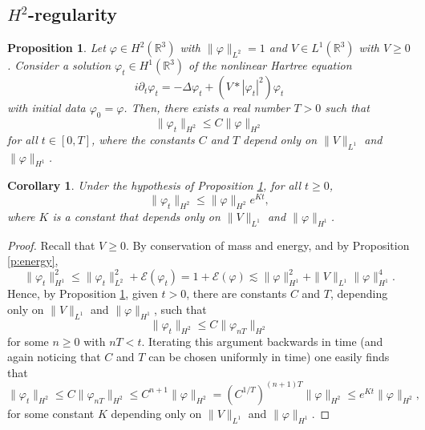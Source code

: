 \documentclass[11pt,a4paper]{scrartcl}
\newtheorem{cor}[thm]{Corollary}
\newtheorem{prp}[thm]{Proposition}
\newcommand{\R}{\mathds{R}}
\begin{document}
\subsection{$H^2$-regularity}


\begin{prp}
  \label{p:reg1}
  Let $\varphi \in H^2(\R^3)$ with $\| \varphi \|_{L^2} = 1$ and $V \in
  L^1(\R^3)$ with $V \ge 0$. Consider a solution $\varphi_t \in H^1(\R^3)$ of
  the nonlinear Hartree equation
  \begin{displaymath}
    i \partial_t \varphi_t = - \Delta \varphi_t + (V * |\varphi_t|^2)
    \varphi_t
  \end{displaymath}
  with initial data $\varphi_0 = \varphi$. Then, there exists a real number $T
  > 0$ such that
  \begin{displaymath}
    \| \varphi_t \|_{H^2} \le C \| \varphi \|_{H^2}
  \end{displaymath}
  for all $t \in [0,T]$, where the constants $C$ and $T$ depend only on $\| V
  \|_{L^1}$ and $\| \varphi \|_{H^1}$.
\end{prp}


\begin{cor}
  \label{c:reg1}
  Under the hypothesis of Proposition \ref{p:reg1}, for all $t \ge 0$,
  \begin{displaymath}
    \| \varphi_t \|_{H^2} \le \| \varphi \|_{H^2} e^{Kt},
  \end{displaymath}
  where $K$ is a constant that depends only on $\| V \|_{L^1}$ and $\| \varphi
  \|_{H^1}$.
\end{cor}


\begin{proof}
  Recall that $V \ge 0$. By conservation of mass and energy, and by
  Proposition \ref{p:energy},
  \begin{displaymath}
    \| \varphi_t \|_{H^1}^2 \le \| \varphi_t \|_{L^2}^2 +
    \mathcal{E}(\varphi_t) = 1 + \mathcal{E}(\varphi) \apprle \| \varphi
    \|_{H^1}^2 + \| V \|_{L^1} \| \varphi \|_{H^1}^4.
  \end{displaymath}
  Hence, by Proposition \ref{p:reg1}, given $t > 0$, there are constants $C$
  and $T$, depending only on $\| V \|_{L^1}$ and $\| \varphi \|_{H^1}$, such
  that
  \begin{displaymath}
    \| \varphi_t \|_{H^2} \le C \| \varphi_{nT} \|_{H^2}
  \end{displaymath}
  for some $n \ge 0$ with $nT < t$. Iterating this argument backwards in time
  (and again noticing that $C$ and $T$ can be chosen uniformly in time) one
  easily finds that
  \begin{displaymath}
    \| \varphi_t \|_{H^2} \le C \| \varphi_{nT} \|_{H^2} \le C^{n+1} \|
    \varphi \|_{H^2} = (C^{1/T})^{(n+1)T}
    \| \varphi \|_{H^2} \le e^{Kt} \| \varphi \|_{H^2},
  \end{displaymath}
  for some constant $K$ depending only on $\| V \|_{L^1}$ and $\| \varphi
  \|_{H^1}$.
\end{proof}
\end{document}
